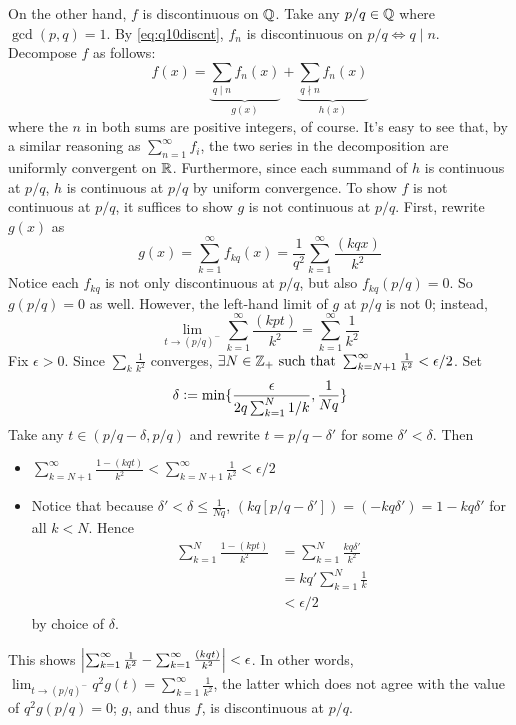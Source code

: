 \documentclass[12pt]{article}
\begin{document}
On the other hand, $f$ is discontinuous on $\mathbb{Q}$. 
Take any $p / q \in \mathbb{Q}$ where $\gcd(p, q) = 1$. 
By \eqref{eq:q10discnt}, $f_n$ is discontinuous on $p / q \iff q \mid n$. 
Decompose $f$ as follows: 
$$f(x) = \underbrace{\sum_{q \mid n} f_n (x)}_{g(x)} + \underbrace{\sum_{q \nmid n} f_n (x)}_{h(x)}$$
where the $n$ in both sums are positive integers, of course.  
It's easy to see that, by a similar reasoning as $\sum_{n = 1}^{\infty} f_i$, the two series in the decomposition are uniformly convergent on $\mathbb{R}$. 
Furthermore, since each summand of $h$ is continuous at $p / q$, $h$ is continuous at $p / q$ by uniform convergence.  
To show $f$ is not continuous at $p / q$, it suffices to show $g$ is not continuous at $p / q$. 
First, rewrite $g(x)$ as 
$$g(x) = \sum_{k = 1}^{\infty} f_{kq}(x) = \frac{1}{q^2} \sum_{k = 1}^{\infty} \frac{(kqx)}{k^2}$$ 
Notice each $f_{kq}$ is not only discontinuous at $p / q$, but also $f_{kq} (p / q) = 0$.  
So $g(p / q) = 0$ as well. 
However, the left-hand limit of $g$ at $p / q$ is not 0; instead, 
$$\lim_{t \rightarrow (p / q)^{-}} \sum_{k = 1}^{\infty} \frac{(kpt)}{k^2} = \sum_{k = 1}^{\infty} \frac{1}{k^2}$$ 
Fix $\epsilon > 0$. 
Since $\sum_k \frac{1}{k^2}$ converges, $\exists N \in \mathbb{Z}_{+} \text{ such that } \sum_{k = N + 1}^{\infty} \frac{1}{k^2} < \epsilon / 2$. 
Set 
$$\delta \vcentcolon= \min\{\frac{\epsilon}{2q\sum_{k = 1}^{N} 1/k}, \frac{1}{Nq}\}$$
Take any $t \in (p / q - \delta, p / q)$ and rewrite $t = p / q - \delta'$ for some $\delta' < \delta$. Then 
\begin{itemize} 
  \item $\sum_{k = N + 1}^{\infty} \frac{1 - (kqt)}{k^2} < \sum_{k = N + 1}^{\infty} \frac{1}{k^2} < \epsilon / 2$
  \item Notice that because $\delta' < \delta \leq \frac{1}{Nq}$, $(kq[p / q - \delta']) = (-kq\delta') = 1 - kq\delta'$ for all $k < N$.  
    Hence 
    \begin{align*}
    \sum_{k = 1}^{N} \frac{1 - (kpt)}{k^2} & = \sum_{k = 1}^{N} \frac{kq\delta'}{k^2} \\ 
                                         & = kq' \sum_{k = 1}^{N} \frac{1}{k} \\ 
                                         & < \epsilon / 2
    \end{align*}
    by choice of $\delta$. 
\end{itemize}
This shows $\left|\sum_{k = 1}^{\infty} \frac{1}{k^2} - \sum_{k = 1}^{\infty} \frac{(kqt)}{k^2}\right| < \epsilon$.
In other words, $\lim_{t \rightarrow (p / q)^{-}} q^2 g(t) = \sum_{k = 1}^{\infty} \frac{1}{k^2}$, 
the latter which does not agree with the value of $q^2 g(p / q) = 0$;
$g$, and thus $f$, is discontinuous at $p / q$.
\end{document}
